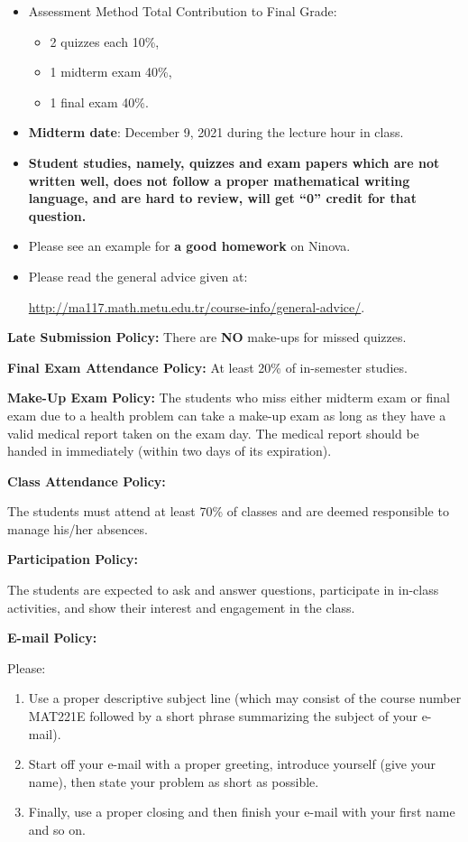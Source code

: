 \documentclass[
  12pt,
]{article}
\providecommand{\tightlist}{%
  \setlength{\itemsep}{0pt}\setlength{\parskip}{0pt}}
\begin{document}
\begin{itemize}
\item
  Assessment Method \quad      \quad \quad                Total
  Contribution to Final Grade:

  \begin{itemize}
  \tightlist
  \item
    2 quizzes each 10\%,\\
  \item
    1 midterm exam 40\%,
  \item
    1 final exam 40\%.
  \end{itemize}
\item
  \textbf{Midterm date}: December 9, 2021 during the lecture hour in
  class.
\item
  \textbf{Student studies, namely, quizzes and exam papers which are not
  written well, does not follow a proper mathematical writing language,
  and are hard to review, will get ``0'' credit for that question.}
\item
  Please see an example for \textbf{a good homework} on Ninova.
\item
  Please read the general advice given at:

  \url{http://ma117.math.metu.edu.tr/course-info/general-advice/}.
\end{itemize}

\textbf{Late Submission Policy:} There are \textbf{NO} make-ups for
missed quizzes.

\textbf{Final Exam Attendance Policy:} At least 20\% of in-semester
studies.

\textbf{Make-Up Exam Policy:} The students who miss either midterm exam
or final exam due to a health problem can take a make-up exam as long as
they have a valid medical report taken on the exam day. The medical
report should be handed in immediately (within two days of its
expiration).

\textbf{Class Attendance Policy:}

The students must attend at least 70\% of classes and are deemed
responsible to manage his/her absences.

\textbf{Participation Policy:}

The students are expected to ask and answer questions, participate in
in-class activities, and show their interest and engagement in the
class.

\textbf{E-mail Policy:}

Please:

\begin{enumerate}
\def\labelenumi{\arabic{enumi}.}
\tightlist
\item
  Use a proper descriptive subject line (which may consist of the course
  number MAT221E followed by a short phrase summarizing the subject of
  your e-mail).
\item
  Start off your e-mail with a proper greeting, introduce yourself (give
  your name), then state your problem as short as possible.
\item
  Finally, use a proper closing and then finish your e-mail with your
  first name and so on.
\end{enumerate}
\end{document}
